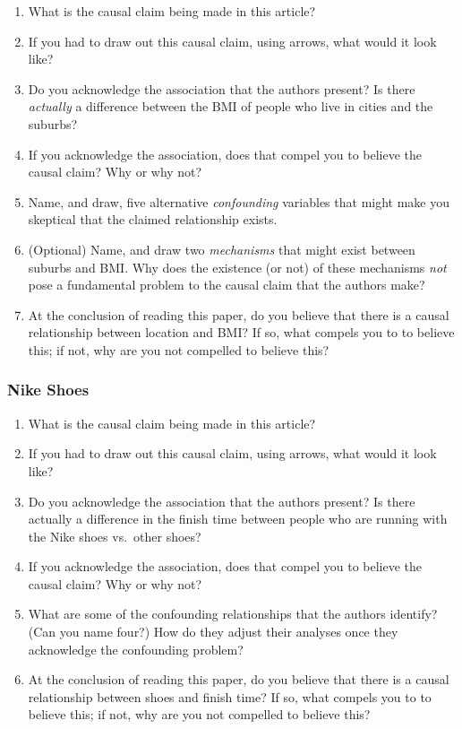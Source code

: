 \documentclass[
]{article}
\providecommand{\tightlist}{%
  \setlength{\itemsep}{0pt}\setlength{\parskip}{0pt}}
\theoremstyle{definition}
\theoremstyle{definition}
\theoremstyle{definition}
\theoremstyle{definition}
\theoremstyle{remark}
\begin{document}
\begin{enumerate}
\def\labelenumi{\arabic{enumi}.}
\tightlist
\item
  What is the causal claim being made in this article?
\item
  If you had to draw out this causal claim, using arrows, what would it look like?
\item
  Do you acknowledge the association that the authors present? Is there \emph{actually} a difference between the BMI of people who live in cities and the suburbs?
\item
  If you acknowledge the association, does that compel you to believe the causal claim? Why or why not?
\item
  Name, and draw, five alternative \emph{confounding} variables that might make you skeptical that the claimed relationship exists.
\item
  (Optional) Name, and draw two \emph{mechanisms} that might exist between suburbs and BMI. Why does the existence (or not) of these mechanisms \emph{not} pose a fundamental problem to the causal claim that the authors make?
\item
  At the conclusion of reading this paper, do you believe that there is a causal relationship between location and BMI? If so, what compels you to to believe this; if not, why are you not compelled to believe this?
\end{enumerate}

\subsubsection{Nike Shoes}\label{nike-shoes}

\begin{enumerate}
\def\labelenumi{\arabic{enumi}.}
\tightlist
\item
  What is the causal claim being made in this article?
\item
  If you had to draw out this causal claim, using arrows, what would it look like?
\item
  Do you acknowledge the association that the authors present? Is there actually a difference in the finish time between people who are running with the Nike shoes vs.~other shoes?
\item
  If you acknowledge the association, does that compel you to believe the causal claim? Why or why not?
\item
  What are some of the confounding relationships that the authors identify? (Can you name four?) How do they adjust their analyses once they acknowledge the confounding problem?
\item
  At the conclusion of reading this paper, do you believe that there is a causal relationship between shoes and finish time? If so, what compels you to to believe this; if not, why are you not compelled to believe this?
\end{enumerate}
\end{document}
